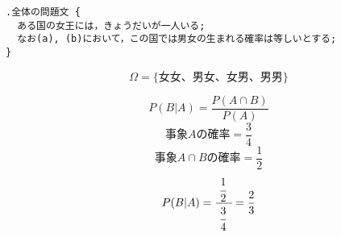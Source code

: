 \documentclass[dvipdfmx,uplatex]{jsarticle}
\begin{document}
  \begin{lstlisting}
.全体の問題文 {
  ある国の女王には，きょうだいが一人いる;
  なお(a), (b)において，この国では男女の生まれる確率は等しいとする;
}
  \end{lstlisting}
  \begin{spacing}{1.3}
  \end{spacing}
  \begin{equation}
    \Omega = \{女女、男女、女男、男男\}
  \end{equation}
  \begin{spacing}{1.3}
  \end{spacing}
  \begin{equation}
    P(B|A)=\frac{P(A \cap B)}{P(A)}
  \end{equation}
  \begin{equation}
    事象Aの確率=\frac{3}{4}
  \end{equation}
  \begin{equation}
    事象A \cap Bの確率=\frac{1}{2}
  \end{equation}
  \begin{equation}
    P(B|A)=\cfrac{\;\cfrac{1}{2}\;\;}{\;\cfrac{3}{4}\;\;}=\frac{2}{3}
  \end{equation}

  \begin{spacing}{1.3}
  \end{spacing}
\end{document}
